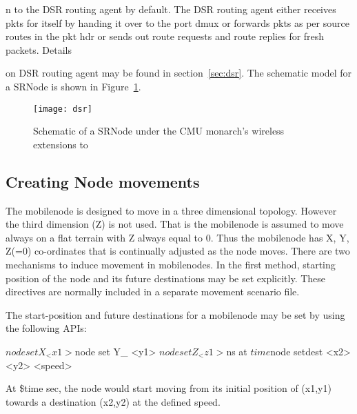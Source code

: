 n to the DSR routing agent by default. The DSR routing agent either receives pkts for itself by handing it over to the port dmux or forwards pkts as per source routes in the pkt hdr or sends out route requests and route replies for fresh packets. Details 





















on DSR routing agent may be found in section~\ref{sec:dsr}. The schematic model for a SRNode is shown in Figure~\ref{fig:mobilenode-dsr}.
\begin{figure}[tb]
    \centerline{\texttt{[image: dsr]}}
    \caption{Schematic of a SRNode under the CMU monarch's wireless extensions to \ns}
    \label{fig:mobilenode-dsr}
\end{figure}

\subsection{Creating Node movements}
\label{sec:mobilenode-movements}

The mobilenode is designed to move in a three dimensional topology. However the third dimension (Z) is not used. That is the mobilenode is assumed to move always on a flat terrain with Z always equal to 0.
Thus the mobilenode has X, Y, Z(=0) co-ordinates that is continually adjusted as the node moves. There are two mechanisms to induce movement in mobilenodes. 
In the first method, starting position of the node and its future destinations may be set explicitly. These directives are normally included in a separate movement scenario file. 

The start-position and future destinations for a mobilenode may be set by using the following APIs:

\begin{program}

$node set X_ <x1>
$node set Y_ <y1>
$node set Z_ <z1>

$ns at $time $node setdest <x2> <y2> <speed>
\end{program}
At \$time sec, the node would start moving from its initial position 
of (x1,y1) towards a destination (x2,y2) at the defined speed.

